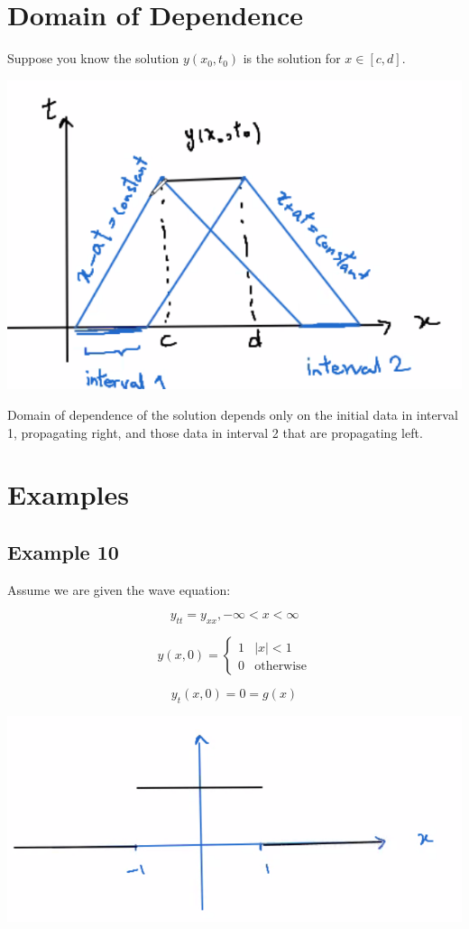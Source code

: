 \documentclass{article}
\begin{document}
\section{Domain of Dependence}

Suppose you know the solution $y(x_0, t_0)$ is the solution for $x \in [c,d]$. 

\includegraphics[width = 0.7 \textwidth]{image3.png}

Domain of dependence of the solution depends only on the initial data in interval 1, propagating right, and those data in interval 2 that are propagating left. 

\section{Examples}

\subsection{Example 10}

Assume we are given the wave equation:

$$y_{tt} = y_{xx}, -\infty < x < \infty$$

$$y(x,0) = \left\{ \begin{matrix} 1 & |x| < 1 \\ 0 & \text{otherwise} \end{matrix} \right.$$

$$y_t(x,0) = 0 = g(x)$$
\begin{center}
    \includegraphics[width = 0.7 \textwidth]{image4.png}
\end{center}
\end{document}
